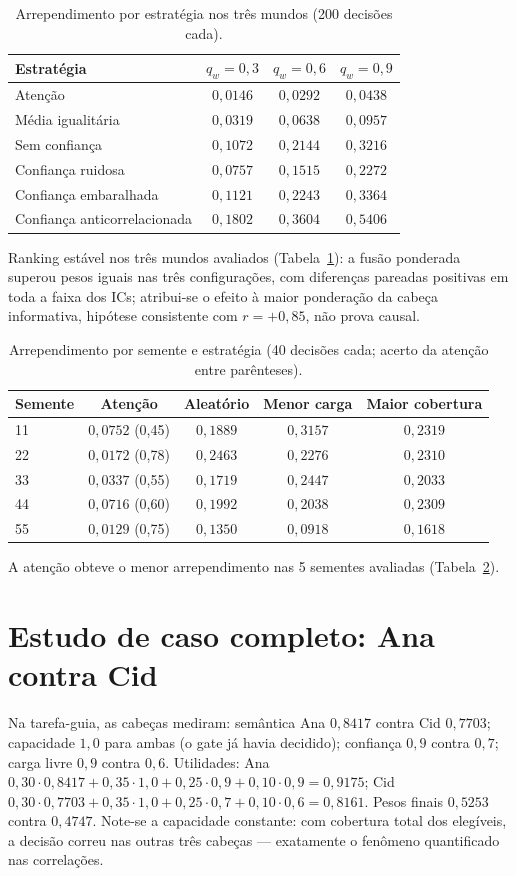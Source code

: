 \begin{table}[h]
\centering
\caption{Arrependimento por estratégia nos três mundos (200 decisões cada).}
\label{tab:mundos}
\begin{tabular}{lccc}
\toprule
Estratégia & $q_w=0{,}3$ & $q_w=0{,}6$ & $q_w=0{,}9$ \\
\midrule
Atenção & $0{,}0146$ & $0{,}0292$ & $0{,}0438$ \\
Média igualitária & $0{,}0319$ & $0{,}0638$ & $0{,}0957$ \\
Sem confiança & $0{,}1072$ & $0{,}2144$ & $0{,}3216$ \\
Confiança ruidosa & $0{,}0757$ & $0{,}1515$ & $0{,}2272$ \\
Confiança embaralhada & $0{,}1121$ & $0{,}2243$ & $0{,}3364$ \\
Confiança anticorrelacionada & $0{,}1802$ & $0{,}3604$ & $0{,}5406$ \\
\bottomrule
\end{tabular}
\end{table}
Ranking estável nos três mundos avaliados (Tabela~\ref{tab:mundos}): a fusão ponderada superou pesos iguais nas três configurações, com diferenças pareadas positivas em toda a faixa dos ICs; atribui-se o efeito à maior ponderação da cabeça informativa, hipótese consistente com $r=+0{,}85$, não prova causal.
\begin{table}[h]
\centering
\caption{Arrependimento por semente e estratégia (40 decisões cada; acerto da atenção entre parênteses).}
\label{tab:seeds}
\begin{tabular}{lcccc}
\toprule
Semente & Atenção & Aleatório & Menor carga & Maior cobertura \\
\midrule
11 & $0{,}0752$ (0,45) & $0{,}1889$ & $0{,}3157$ & $0{,}2319$ \\
22 & $0{,}0172$ (0,78) & $0{,}2463$ & $0{,}2276$ & $0{,}2310$ \\
33 & $0{,}0337$ (0,55) & $0{,}1719$ & $0{,}2447$ & $0{,}2033$ \\
44 & $0{,}0716$ (0,60) & $0{,}1992$ & $0{,}2038$ & $0{,}2309$ \\
55 & $0{,}0129$ (0,75) & $0{,}1350$ & $0{,}0918$ & $0{,}1618$ \\
\bottomrule
\end{tabular}
\end{table}
A atenção obteve o menor arrependimento nas 5 sementes avaliadas (Tabela~\ref{tab:seeds}).
\section{Estudo de caso completo: Ana contra Cid}
Na tarefa-guia, as cabeças mediram: semântica Ana $0{,}8417$ contra Cid $0{,}7703$; capacidade $1{,}0$ para ambas (o gate já havia decidido); confiança $0{,}9$ contra $0{,}7$; carga livre $0{,}9$ contra $0{,}6$. Utilidades: Ana $0{,}30\cdot0{,}8417+0{,}35\cdot1{,}0+0{,}25\cdot0{,}9+0{,}10\cdot0{,}9=0{,}9175$; Cid $0{,}30\cdot0{,}7703+0{,}35\cdot1{,}0+0{,}25\cdot0{,}7+0{,}10\cdot0{,}6=0{,}8161$. Pesos finais $0{,}5253$ contra $0{,}4747$. Note-se a capacidade constante: com cobertura total dos elegíveis, a decisão correu nas outras três cabeças --- exatamente o fenômeno quantificado nas correlações.
